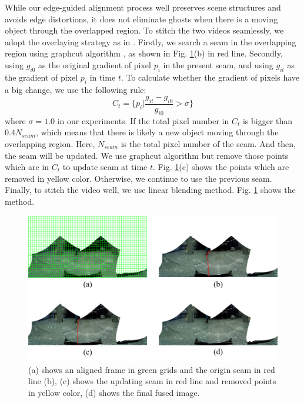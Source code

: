 \documentclass[conference]{IEEEtran}
\begin{document}
While our edge-guided alignment process well preserves scene structures and avoids edge distortions, it does not eliminate ghosts when there is a moving object through the overlapped region.
To stitch the two videos seamlessly, we adopt the overlaying strategy as in \cite{he2016parallax}. 
Firstly, we search a seam in the overlapping region using graphcut algorithm \cite{boykov2004experimental}, as shown in Fig. \ref{fig:p24}(b) in red line.
Secondly, using $g_{i0}$ as the original gradient of pixel $p_i$ in the present seam, and using $g_{it}$ as the gradient of pixel $p_i$ in time $t$. To calculate whether the gradient
of pixels have a big change, we use the following rule:
\begin{equation}
\textit{C}_{t}=\{p_{i}|\frac{g_{it}-g_{i0}}{g_{i0}}>\sigma\}
\end{equation}
where $\sigma=1.0$ in our experiments.
If the total pixel number in $\textit{C}_t$ is bigger than $0.4N_{seam}$, which means that there is likely a new object moving through the overlapping region. 
Here, $N_{seam}$ is the total pixel number of the seam. 
And then, the seam will be updated. We use graphcut algorithm but remove those points which are in $C_t$ to update seam at time $t$. 
Fig. \ref{fig:p24}(c) shows the points which are removed in yellow color.
Otherwise, we continue to use the previous seam.
Finally, to stitch the video well, we use linear blending method.
Fig. \ref{fig:p24} shows the method.
\begin{figure}[h]
\centering
\includegraphics[scale=0.42]{picture50.png}
\caption{(a) shows an aligned frame in green grids and the origin seam in red line (b), (c) shows the updating seam in red line and removed points in yellow color, (d) shows the final fused image.}
\label{fig:p24}
\end{figure}
\end{document}
